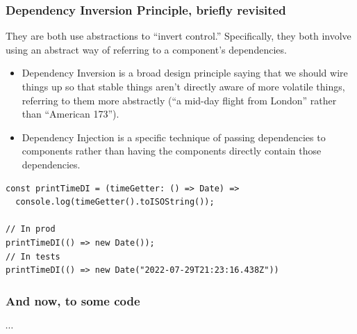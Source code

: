 \documentclass[aspectratio=169]{beamer}
\begin{document}
\begin{frame}[fragile]
  \frametitle{Dependency Inversion Principle, briefly revisited}
  They are both use abstractions to ``invert control.'' Specifically, they both
  involve using an abstract way of referring to a component's dependencies.

  \begin{itemize}
    \item Dependency Inversion is a broad design principle saying that we should
          wire things up so that stable things aren't directly aware of more
          volatile things, referring to them more abstractly (``a mid-day flight
          from London'' rather than ``American 173'').
    \item Dependency Injection is a specific technique of passing dependencies
          to components rather than having the components directly contain those
          dependencies.
  \end{itemize}

  \vspace{1em}

  \begin{verbatim}
const printTimeDI = (timeGetter: () => Date) =>
  console.log(timeGetter().toISOString());

// In prod
printTimeDI(() => new Date());
// In tests
printTimeDI(() => new Date("2022-07-29T21:23:16.438Z"))

  \end{verbatim}
\end{frame}

\begin{frame}
  \frametitle{And now, to some code}
  $\cdots$
\end{frame}
\end{document}

